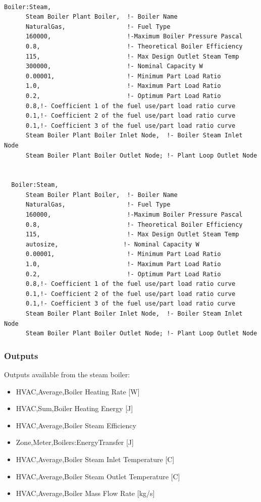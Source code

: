 \begin{lstlisting}

Boiler:Steam,
      Steam Boiler Plant Boiler,  !- Boiler Name
      NaturalGas,                 !- Fuel Type
      160000,                     !-Maximum Boiler Pressure Pascal
      0.8,                        !- Theoretical Boiler Efficiency
      115,                        !- Max Design Outlet Steam Temp
      300000,                     !- Nominal Capacity W
      0.00001,                    !- Minimum Part Load Ratio
      1.0,                        !- Maximum Part Load Ratio
      0.2,                        !- Optimum Part Load Ratio
      0.8,!- Coefficient 1 of the fuel use/part load ratio curve
      0.1,!- Coefficient 2 of the fuel use/part load ratio curve
      0.1,!- Coefficient 3 of the fuel use/part load ratio curve
      Steam Boiler Plant Boiler Inlet Node,  !- Boiler Steam Inlet Node
      Steam Boiler Plant Boiler Outlet Node; !- Plant Loop Outlet Node


  Boiler:Steam,
      Steam Boiler Plant Boiler,  !- Boiler Name
      NaturalGas,                 !- Fuel Type
      160000,                     !-Maximum Boiler Pressure Pascal
      0.8,                        !- Theoretical Boiler Efficiency
      115,                        !- Max Design Outlet Steam Temp
      autosize,                  !- Nominal Capacity W
      0.00001,                    !- Minimum Part Load Ratio
      1.0,                        !- Maximum Part Load Ratio
      0.2,                        !- Optimum Part Load Ratio
      0.8,!- Coefficient 1 of the fuel use/part load ratio curve
      0.1,!- Coefficient 2 of the fuel use/part load ratio curve
      0.1,!- Coefficient 3 of the fuel use/part load ratio curve
      Steam Boiler Plant Boiler Inlet Node,  !- Boiler Steam Inlet Node
      Steam Boiler Plant Boiler Outlet Node; !- Plant Loop Outlet Node
\end{lstlisting}

\subsubsection{Outputs}\label{outputs-11-004}

Outputs available from the steam boiler:

\begin{itemize}
    \item
    HVAC,Average,Boiler Heating Rate {[}W{]}
    \item
    HVAC,Sum,Boiler Heating Energy {[}J{]}
    \item
    HVAC,Average,Boiler Steam Efficiency
    \item
    Zone,Meter,Boilers:EnergyTransfer {[}J{]}
    \item
    HVAC,Average,Boiler Steam Inlet Temperature {[}C{]}
    \item
    HVAC,Average,Boiler Steam Outlet Temperature {[}C{]}
    \item
    HVAC,Average,Boiler Mass Flow Rate {[}kg/s{]}
\end{itemize}

